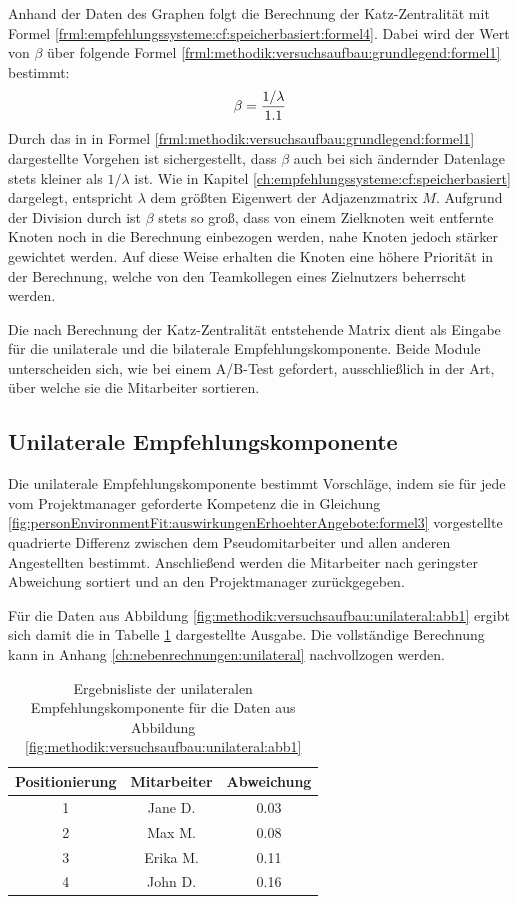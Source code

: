 Anhand der Daten des Graphen folgt die Berechnung der Katz-Zentralität mit Formel \ref{frml:empfehlungssysteme:cf:speicherbasiert:formel4}. Dabei wird der Wert von $\beta$ über folgende Formel \ref{frml:methodik:versuchsaufbau:grundlegend:formel1} bestimmt: 
\begin{equation}
	\beta = \frac{1/\lambda}{1.1}
	\label{frml:methodik:versuchsaufbau:grundlegend:formel1}
\end{equation}
Durch das in in Formel \ref{frml:methodik:versuchsaufbau:grundlegend:formel1} dargestellte Vorgehen ist sichergestellt, dass $\beta$ auch bei sich ändernder Datenlage stets kleiner als $1/\lambda$ ist. Wie in Kapitel \ref{ch:empfehlungssysteme:cf:speicherbasiert} dargelegt, entspricht $\lambda$ dem größten Eigenwert der Adjazenzmatrix $M$. Aufgrund der Division durch \nenner ist $\beta$ stets so groß, dass von einem Zielknoten weit entfernte Knoten noch in die Berechnung einbezogen werden, nahe Knoten jedoch stärker gewichtet werden. Auf diese Weise erhalten die Knoten eine höhere Priorität in der Berechnung, welche von den Teamkollegen eines Zielnutzers beherrscht werden.

Die nach Berechnung der Katz-Zentralität entstehende Matrix dient als Eingabe für die unilaterale und die bilaterale Empfehlungskomponente. Beide Module unterscheiden sich, wie bei einem A/B-Test gefordert, ausschließlich in der Art, über welche sie die Mitarbeiter sortieren.

\subsection{Unilaterale Empfehlungskomponente}
\label{ch:methodik:versuchsaufbau:unilateral}
Die unilaterale Empfehlungskomponente bestimmt Vorschläge, indem sie für jede vom Projektmanager geforderte Kompetenz die in Gleichung \ref{fig:personEnvironmentFit:auswirkungenErhoehterAngebote:formel3} vorgestellte quadrierte Differenz zwischen dem Pseudomitarbeiter und allen anderen Angestellten bestimmt. Anschließend werden die Mitarbeiter nach geringster Abweichung sortiert und an den Projektmanager zurückgegeben.

Für die Daten aus Abbildung \ref{fig:methodik:versuchsaufbau:unilateral:abb1} ergibt sich damit die in Tabelle \ref{tbl:methodik:versuchsaufbau:unilateral:tbl2} dargestellte Ausgabe. Die vollständige Berechnung kann in Anhang \ref{ch:nebenrechnungen:unilateral} nachvollzogen werden.

\begin{table}[h]
	\centering
	\begin{tabular}{c|c|c}
		Positionierung & Mitarbeiter & Abweichung\\
		\hline
		1 & Jane D.  & 0.03\\
		2 & Max M.   & 0.08\\
		3 & Erika M. & 0.11\\
		4 & John D.  & 0.16
	\end{tabular}
	\caption{Ergebnisliste der unilateralen Empfehlungskomponente für die Daten aus Abbildung \ref{fig:methodik:versuchsaufbau:unilateral:abb1}}
	\label{tbl:methodik:versuchsaufbau:unilateral:tbl2}
\end{table}

